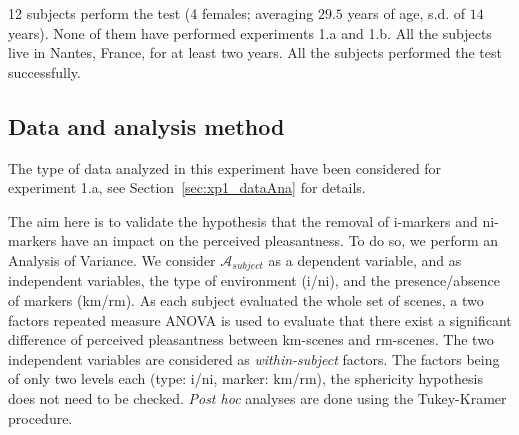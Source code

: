 \documentclass[12pt]{elsarticle}
\begin{document}
12 subjects perform the test (4 females; averaging $29.5$ years of age, s.d. of $14$ years). None of them have performed experiments 1.a and 1.b. All the subjects live in Nantes, France, for at least two years. All the subjects performed the test successfully.

\subsection{Data and analysis method}


The type of data analyzed in this experiment have been considered for experiment 1.a, see Section~\ref{sec:xp1_dataAna} for details.


The aim here is to validate the hypothesis that the removal of i-markers and ni-markers have an impact on the perceived pleasantness. To do so, we perform an Analysis of Variance. We consider $\mathcal{A}_{subject}$ as a dependent variable, and as independent variables, the type of environment (i/ni), and the presence/absence of markers (km/rm). As each subject evaluated the whole set of scenes, a two factors repeated measure ANOVA is used to evaluate that there exist a significant difference of perceived pleasantness between km-scenes and rm-scenes. The two independent variables are considered as \emph{within-subject} factors. The factors being of only two levels each (type: i/ni,  marker: km/rm), the sphericity hypothesis does not need to be checked. \emph{Post hoc} analyses are done using the Tukey-Kramer procedure.
\end{document}
